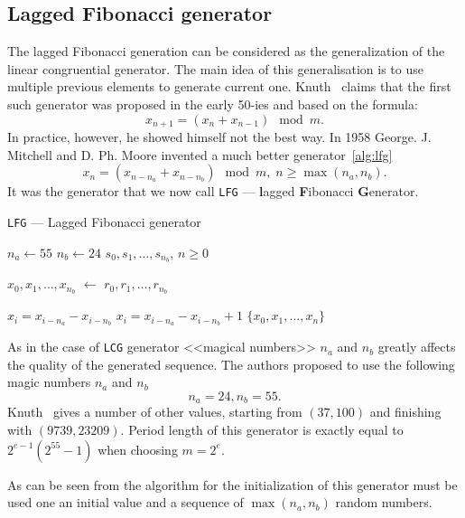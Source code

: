 \documentclass[%
floatfix,
showkeys,
nofootinbib, %
superscriptaddress, %
]{revtex4-1}
\begin{document}
\subsection{Lagged Fibonacci generator}

The lagged Fibonacci generation can be considered as the
generalization of the linear congruential generator. The main idea of
this generalisation is to use multiple previous elements to generate
current one. Knuth~\cite{L_DKnuth:1997:en} claims that the first such
generator was proposed in the early 50-ies and based on the formula:
\[
        x_{n+1} = (x_{n} + x_{n-1}) \mod m.
\]
In practice, however, he showed himself not the best way. In 1958
George. J. Mitchell and D. Ph. Moore invented a much better
generator~\ref{alg:lfg}
\[
        x_{n} = (x_{n-n_{a}} + x_{n - n_{b}}) \mod m,\; n \geqslant \max(n_a, n_b).
\]
It was the generator that we now call \texttt{LFG} --- \textbf{l}agged
\textbf{F}ibonacci \textbf{G}enerator.

\begin{algorithm}[H]
  \caption{\texttt{LFG} --- Lagged Fibonacci generator}\label{alg:lfg}
  \begin{algorithmic}
    \State $n_{a} \leftarrow 55$
    \State $n_{b} \leftarrow 24$
    \Require $s_0, s_1,\ldots,s_{n_{b}}$, $n\geqslant  0$
    
    \State $x_{0},x_{1},\ldots,x_{n_{b}}$ $\leftarrow$ $r_0, r_1,\ldots,r_{n_{b}}$
    
        \State $x_{i} = x_{i-n_a} - x_{i-n_b}$
        \State $x_i = x_{i-n_a} - x_{i-n_b} + 1$
      \EndIf
    \EndFor
    \State \Return $\{x_{0},x_{1},\ldots,x_{n}\}$
  \end{algorithmic}
\end{algorithm}

As in the case of \texttt{LCG} generator <<magical numbers>> $n_a$ and
$n_b$ greatly affects the quality of the generated sequence. The
authors proposed to use the following magic numbers $n_a$ and $n_b$
\[
        n_a = 24, n_b = 55.
\]
Knuth~\cite{L_DKnuth:1997:en} gives a number of other values, starting
from $(37, 100)$ and finishing with $(9739, 23209)$. Period length of
this generator is exactly equal to $2^{e-1}(2^{55} - 1)$ when choosing
$m = 2^e$.

As can be seen from the algorithm for the initialization of this
generator must be used one an initial value and a sequence of
$\max(n_a, n_b)$ random numbers.
\end{document}
